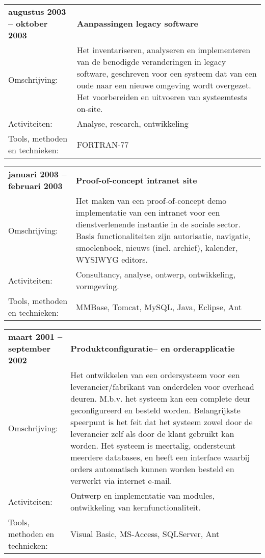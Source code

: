 \documentclass[a4paper]{article}
\newcommand{\mysql}{My\-SQL}
\newcommand{\omschrijving}{Omschrijving:}
\newcommand{\activiteiten}{Activiteiten:}
\newcommand{\tools}{Tools, methoden en technieken:}
\newcommand{\tabelh}[1]{\textbf{#1}}
\begin{document}
        \medskip
        
        \begin{tabular}{l p{10cm}}
            \tabelh{augustus 2003 -- oktober 2003} & \tabelh{Aanpassingen legacy
            software} \\
            \omschrijving &
            Het inventariseren, analyseren en implementeren van de benodigde veranderingen
            in legacy software, geschreven voor een systeem dat van een oude naar een
            nieuwe omgeving wordt overgezet. Het voorbereiden en uitvoeren van
            systeemtests on-site. \\
            \activiteiten &
            Analyse, research, ontwikkeling \\
            \tools &
            FORTRAN-77 \\
        \end{tabular}
        
        \medskip
        
        \begin{tabular}{l p{10cm}}
            \tabelh{januari 2003 -- februari 2003} & \tabelh{Proof-of-concept
            intranet site} \\
            \omschrijving &
            Het maken van een proof-of-concept demo implementatie van een intranet voor
            een dienstverlenende instantie in de sociale sector. Basis functionaliteiten
            zijn autorisatie, navigatie, smoelenboek, nieuws (incl. archief), kalender,
            WYSIWYG editors. \\
            \activiteiten & Consultancy, analyse, ontwerp, ontwikkeling,
            vormgeving. \\
            \tools & 
            MMBase, Tomcat, \mysql, Java, Eclipse, Ant \\
        \end{tabular}

        \medskip
        
        \begin{tabular}{l p{10cm}}
            \tabelh{maart 2001 -- september 2002} &
            \tabelh{Produktconfiguratie-- en orderapplicatie} \\
            \omschrijving &
            Het ontwikkelen van een ordersysteem voor een
            leverancier/fabrikant van onderdelen voor overhead deuren. M.b.v.
            het systeem kan een complete deur geconfigureerd en besteld
            worden. Belangrijkste speerpunt is het feit dat het systeem zowel
            door de leverancier zelf als door de klant gebruikt kan worden.
            Het systeem is meertalig, ondersteunt meerdere databases, en heeft
            een interface waarbij orders automatisch kunnen worden besteld en
            verwerkt via internet e-mail.  \\ 
            \activiteiten & 
            Ontwerp en implementatie van modules, ontwikkeling van
            kernfunctionaliteit. \\
            \tools &
            Visual Basic, MS-Access, SQLServer, Ant \\
        \end{tabular}
      
\end{document}

